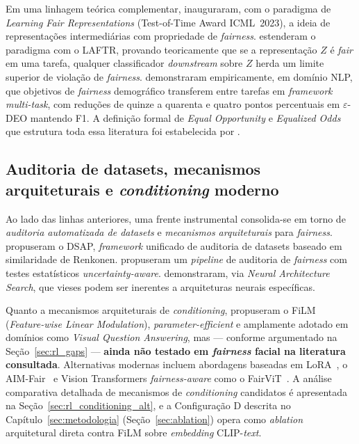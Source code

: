 Em uma linhagem teórica complementar,  inauguraram, com o paradigma de \emph{Learning Fair Representations} (Test-of-Time Award ICML~2023), a ideia de representações intermediárias com propriedade de \emph{fairness}.  estenderam o paradigma com o LAFTR, provando teoricamente que se a representação $Z$ é \emph{fair} em uma tarefa, qualquer classificador \emph{downstream} sobre $Z$ herda um limite superior de violação de \emph{fairness}.  demonstraram empiricamente, em domínio NLP, que objetivos de \emph{fairness} demográfico transferem entre tarefas em \emph{framework multi-task}, com reduções de quinze a quarenta e quatro pontos percentuais em $\varepsilon$-DEO mantendo F1. A definição formal de \emph{Equal Opportunity} e \emph{Equalized Odds} que estrutura toda essa literatura foi estabelecida por .

\subsection{Auditoria de datasets, mecanismos arquiteturais e \emph{conditioning} moderno}
\label{sec:rl_arquit}

Ao lado das linhas anteriores, uma frente instrumental consolida-se em torno de \emph{auditoria automatizada de datasets} e \emph{mecanismos arquiteturais} para \emph{fairness}.  propuseram o DSAP, \emph{framework} unificado de auditoria de datasets baseado em similaridade de Renkonen.  propuseram um \emph{pipeline} de auditoria de \emph{fairness} com testes estatísticos \emph{uncertainty-aware}.  demonstraram, via \emph{Neural Architecture Search}, que vieses podem ser inerentes a arquiteturas neurais específicas.

Quanto a mecanismos arquiteturais de \emph{conditioning},  propuseram o FiLM (\emph{Feature-wise Linear Modulation}), \emph{parameter-efficient} e amplamente adotado em domínios como \emph{Visual Question Answering}, mas --- conforme argumentado na Seção~\ref{sec:rl_gaps} --- \textbf{ainda não testado em \emph{fairness} facial na literatura consultada}. Alternativas modernas incluem abordagens baseadas em LoRA~\cite{sukumaran2024fairlora,bian2025lora}, o AIM-Fair~\cite{zhao2025aim} e Vision Transformers \emph{fairness-aware} como o FairViT~\cite{tian2024fairvit}. A análise comparativa detalhada de mecanismos de \emph{conditioning} candidatos é apresentada na Seção~\ref{sec:rl_conditioning_alt}, e a Configuração D descrita no Capítulo~\ref{sec:metodologia} (Seção~\ref{sec:ablation}) opera como \emph{ablation} arquitetural direta contra FiLM sobre \emph{embedding} CLIP-\emph{text}.

